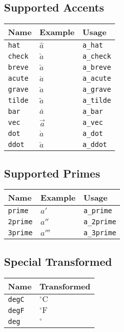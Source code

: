 \documentclass[12pt]{article}
\begin{document}
\subsection{Supported Accents}
\label{accents}

\begin{tabular}{lll}
    \toprule
    Name & Example & Usage\\
    \midrule
    \verb|hat|    & $\hat{a}$    & \verb|a_hat|\\
    \verb|check|  & $\check{a}$  & \verb|a_check|\\
    \verb|breve|  & $\breve{a}$  & \verb|a_breve|\\
    \verb|acute|  & $\acute{a}$  & \verb|a_acute|\\
    \verb|grave|  & $\grave{a}$  & \verb|a_grave|\\
    \verb|tilde|  & $\tilde{a}$  & \verb|a_tilde|\\
    \verb|bar|    & $\bar{a}$    & \verb|a_bar|\\
    \verb|vec|    & $\vec{a}$    & \verb|a_vec|\\
    \verb|dot|    & $\dot{a}$    & \verb|a_dot|\\
    \verb|ddot|   & $\ddot{a}$   & \verb|a_ddot|\\
    \bottomrule
\end{tabular}

\subsection{Supported Primes}
\label{primes}

\begin{tabular}{lll}
    \toprule
    Name & Example & Usage\\
    \midrule
    \verb|prime|    & $a'$    & \verb|a_prime|\\
    \verb|2prime|  & $a''$  & \verb|a_2prime|\\
    \verb|3prime|  & $a'''$  & \verb|a_3prime|\\
    \bottomrule
\end{tabular}

\subsection{Special Transformed}
\label{transformed}

\begin{tabular}{ll}
    \toprule
    Name & Transformed\\
    \midrule
    \verb|degC|    & $^\circ\mathrm{C}$\\
    \verb|degF|  & $^\circ\mathrm{F}$\\
    \verb|deg|  & $^\circ$\\
    \bottomrule
\end{tabular}
\end{document}
